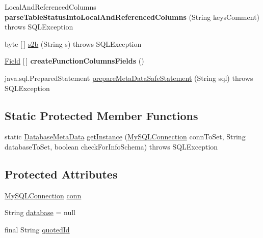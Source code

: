 \begin{DoxyCompactItemize}
Local\+And\+Referenced\+Columns {\bfseries parse\+Table\+Status\+Into\+Local\+And\+Referenced\+Columns} (String keys\+Comment)  throws S\+Q\+L\+Exception 
\item 
byte \mbox{[}$\,$\mbox{]} \mbox{\hyperlink{classcom_1_1mysql_1_1jdbc_1_1_database_meta_data_acb5737394e592106fb3bc229341836e7}{s2b}} (String s)  throws S\+Q\+L\+Exception 
\item 
\mbox{\label{classcom_1_1mysql_1_1jdbc_1_1_database_meta_data_a147583478890fade9dd9261c02241169}} 
\mbox{\hyperlink{classcom_1_1mysql_1_1jdbc_1_1_field}{Field}} \mbox{[}$\,$\mbox{]} {\bfseries create\+Function\+Columns\+Fields} ()
\item 
java.\+sql.\+Prepared\+Statement \mbox{\hyperlink{classcom_1_1mysql_1_1jdbc_1_1_database_meta_data_a7e055f9029b2da1d3a7d014bca117da4}{prepare\+Meta\+Data\+Safe\+Statement}} (String sql)  throws S\+Q\+L\+Exception 
\end{DoxyCompactItemize}
\subsection*{Static Protected Member Functions}
\begin{DoxyCompactItemize}
\item 
static \mbox{\hyperlink{classcom_1_1mysql_1_1jdbc_1_1_database_meta_data}{Database\+Meta\+Data}} \mbox{\hyperlink{classcom_1_1mysql_1_1jdbc_1_1_database_meta_data_a7f3edbb716bb075ccd3821993ea718be}{get\+Instance}} (\mbox{\hyperlink{interfacecom_1_1mysql_1_1jdbc_1_1_my_s_q_l_connection}{My\+S\+Q\+L\+Connection}} conn\+To\+Set, String database\+To\+Set, boolean check\+For\+Info\+Schema)  throws S\+Q\+L\+Exception 
\end{DoxyCompactItemize}
\subsection*{Protected Attributes}
\begin{DoxyCompactItemize}
\item 
\mbox{\hyperlink{interfacecom_1_1mysql_1_1jdbc_1_1_my_s_q_l_connection}{My\+S\+Q\+L\+Connection}} \mbox{\hyperlink{classcom_1_1mysql_1_1jdbc_1_1_database_meta_data_a766f5f2419849b91cf5b49eb4fa5cf41}{conn}}
\item 
String \mbox{\hyperlink{classcom_1_1mysql_1_1jdbc_1_1_database_meta_data_adc1ed5a59c358c1520695c0cd3462e8e}{database}} = null
\item 
final String \mbox{\hyperlink{classcom_1_1mysql_1_1jdbc_1_1_database_meta_data_a4ce10087ed47ff740b485c2fe2b63fb5}{quoted\+Id}}
\end{DoxyCompactItemize}
